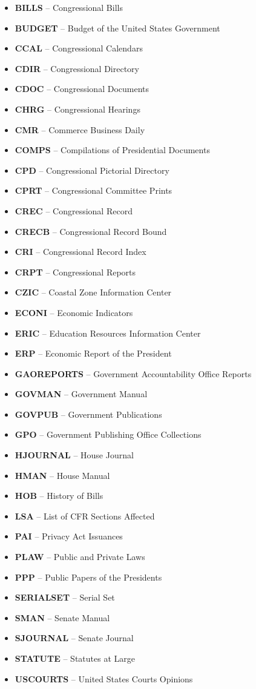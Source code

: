 \begin{itemize}
  \item \textbf{BILLS} -- Congressional Bills
  \item \textbf{BUDGET} -- Budget of the United States Government
  \item \textbf{CCAL} -- Congressional Calendars
  \item \textbf{CDIR} -- Congressional Directory
  \item \textbf{CDOC} -- Congressional Documents
  \item \textbf{CHRG} -- Congressional Hearings
  \item \textbf{CMR} -- Commerce Business Daily
  \item \textbf{COMPS} -- Compilations of Presidential Documents
  \item \textbf{CPD} -- Congressional Pictorial Directory
  \item \textbf{CPRT} -- Congressional Committee Prints
  \item \textbf{CREC} -- Congressional Record
  \item \textbf{CRECB} -- Congressional Record Bound
  \item \textbf{CRI} -- Congressional Record Index
  \item \textbf{CRPT} -- Congressional Reports
  \item \textbf{CZIC} -- Coastal Zone Information Center
  \item \textbf{ECONI} -- Economic Indicators
  \item \textbf{ERIC} -- Education Resources Information Center
  \item \textbf{ERP} -- Economic Report of the President
  \item \textbf{GAOREPORTS} -- Government Accountability Office Reports
  \item \textbf{GOVMAN} -- Government Manual
  \item \textbf{GOVPUB} -- Government Publications
  \item \textbf{GPO} -- Government Publishing Office Collections
  \item \textbf{HJOURNAL} -- House Journal
  \item \textbf{HMAN} -- House Manual
  \item \textbf{HOB} -- History of Bills
  \item \textbf{LSA} -- List of CFR Sections Affected
  \item \textbf{PAI} -- Privacy Act Issuances
  \item \textbf{PLAW} -- Public and Private Laws
  \item \textbf{PPP} -- Public Papers of the Presidents
  \item \textbf{SERIALSET} -- Serial Set
  \item \textbf{SMAN} -- Senate Manual
  \item \textbf{SJOURNAL} -- Senate Journal
  \item \textbf{STATUTE} -- Statutes at Large
  \item \textbf{USCOURTS} -- United States Courts Opinions
\end{itemize}

